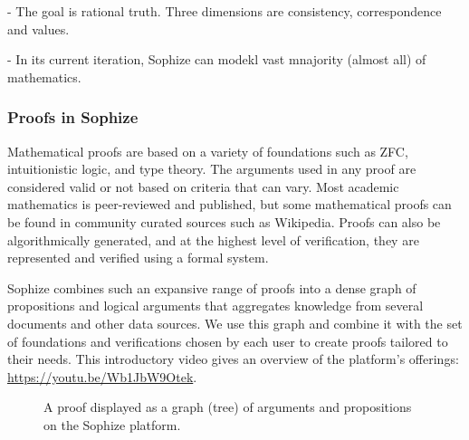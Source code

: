 \documentclass[a4paper]{article}
\begin{document}
- The goal is rational truth. Three dimensions are consistency, correspondence and values.

- In its current iteration, Sophize can modekl vast mnajority (almost all)  of mathematics.

\subsubsection*{Proofs in Sophize}

Mathematical proofs are based on a variety of foundations such as ZFC, intuitionistic logic, and type theory. The arguments used in any proof are considered valid or not based on criteria that can vary. Most academic mathematics is peer-reviewed and published, but some mathematical proofs can be found in community curated sources such as Wikipedia. Proofs can also be algorithmically generated, and at the highest level of verification, they are represented and verified using a formal system. 

Sophize combines such an expansive range of proofs into a dense graph of propositions and logical arguments that aggregates knowledge from several documents and other data sources. We use this graph and combine it with the set of foundations and verifications chosen by each user to create proofs tailored to their needs. This introductory video gives an overview of the platform's offerings: \url{https://youtu.be/Wb1JbW9Otek}.

\begin{figure}[ht]
\begin{center}
\caption{A proof displayed as a graph (tree) of arguments and propositions on the Sophize platform.}
\label{proof_tree}
\end{center}
\end{figure}
\end{document}
